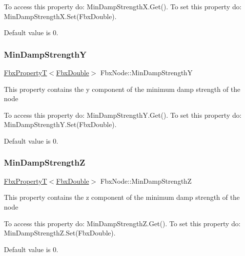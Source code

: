 To access this property do\+: Min\+Damp\+Strength\+X.\+Get(). To set this property do\+: Min\+Damp\+Strength\+X.\+Set(\+Fbx\+Double).

Default value is 0. \mbox{\label{class_fbx_node_ae3a54daa1551f3f33fa5d290074401fe}} 
\subsubsection{\texorpdfstring{Min\+Damp\+StrengthY}{MinDampStrengthY}}
{\footnotesize\ttfamily \hyperlink{class_fbx_property_t}{Fbx\+PropertyT}$<$\hyperlink{fbxtypes_8h_a171e72a1c46fc15c1a6c9c31948c1c5b}{Fbx\+Double}$>$ Fbx\+Node\+::\+Min\+Damp\+StrengthY}

This property contains the y component of the minimum damp strength of the node

To access this property do\+: Min\+Damp\+Strength\+Y.\+Get(). To set this property do\+: Min\+Damp\+Strength\+Y.\+Set(\+Fbx\+Double).

Default value is 0. \mbox{\label{class_fbx_node_a7d688b80e5b21f36250ec63a39b071c4}} 
\subsubsection{\texorpdfstring{Min\+Damp\+StrengthZ}{MinDampStrengthZ}}
{\footnotesize\ttfamily \hyperlink{class_fbx_property_t}{Fbx\+PropertyT}$<$\hyperlink{fbxtypes_8h_a171e72a1c46fc15c1a6c9c31948c1c5b}{Fbx\+Double}$>$ Fbx\+Node\+::\+Min\+Damp\+StrengthZ}

This property contains the z component of the minimum damp strength of the node

To access this property do\+: Min\+Damp\+Strength\+Z.\+Get(). To set this property do\+: Min\+Damp\+Strength\+Z.\+Set(\+Fbx\+Double).

Default value is 0. \mbox{\label{class_fbx_node_afa440edf621ff6e21b1c1abd626ac82a}} 
